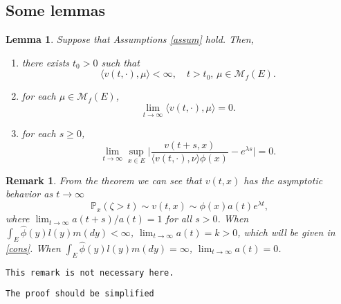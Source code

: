 \documentclass[12pt,a4paper]{amsart}
\numberwithin{equation}{section}
\theoremstyle{plain}
\newtheorem{lem}[thm]{Lemma}
\newtheorem{remark}{Remark}
\theoremstyle{definition}
\theoremstyle{remark}
\begin{document}
\subsection{Some lemmas}
\begin{lem}\label{lem:extinc}
	Suppose that Assumptions \ref{assum} hold. Then,
\begin{enumerate}
\item
	there exists $t_0>0$ such that
\[
	\langle v(t,\cdot),\mu\rangle <\infty, \quad t>t_0, \, \mu \in \mathcal M_f(E).
\]
\item	for each $\mu \in \mathcal M_f(E)$,
\[
	\lim_{t\rightarrow\infty}\langle v(t,\cdot),\mu\rangle=0.
\]
\item
	for each $s\geq 0$,
\begin{equation} \label{one point ratio limit}
	\lim_{t\to \infty} \sup_{x\in E}\Big|\frac{v(t+s,x)}{\langle v(t,\cdot),\nu\rangle\phi(x) } - e^{\lambda s} \Big|
	=0.
\end{equation}
\end{enumerate}
\end{lem}
\begin{remark}
 From the theorem we can see that $v(t,x)$  has the asymptotic behavior as $t\to\infty$
 \[
 \mathbb P_x(\zeta>t)\sim v(t,x)\sim \phi(x)a(t)e^{\lambda t},
 \]
 where $\lim_{t\rightarrow\infty}a(t+s)/a(t)=1$ for all $s>0$.  When $\int_E\widehat\phi(y)l(y)m(dy)<\infty$, $\lim_{t\rightarrow\infty}a(t)=k>0$, which will be given in \eqref{cons}.  When $\int_E\widehat\phi(y)l(y)m(dy)=\infty$, $\lim_{t\rightarrow\infty}a(t)=0$.
 \end{remark}

{\tt This remark is not necessary here.}

{\tt The proof should be simplified}
\end{document}
